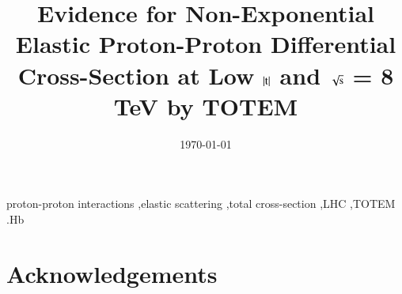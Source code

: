 \documentclass[3p,onecolumn,12pt,times,longtitle]{elsarticle}
\begin{document}
\begin{frontmatter}

\title{Evidence for Non-Exponential Elastic Proton-Proton Differential Cross-Section at Low $|\hbox{t}|$ and $\sqrt{\hbox{s}}$ = 8 TeV by TOTEM}



\date{\today}


\begin{abstract}

\end{abstract}

\begin{keyword}
proton-proton interactions \sep elastic scattering \sep total cross-section \sep LHC \sep TOTEM
.Hb %
\end{keyword}
\end{frontmatter}















\section*{Acknowledgements}


\end{document}
